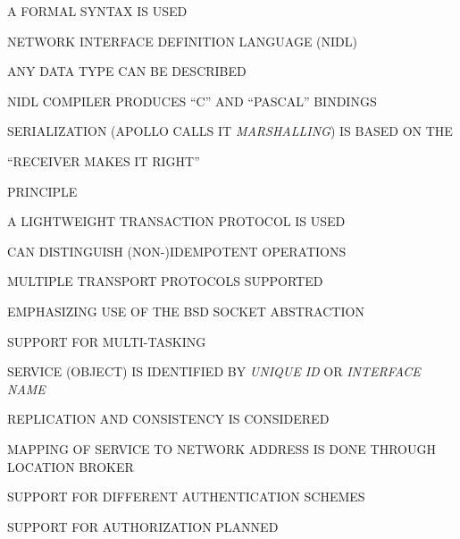 \begin{bwslide}

\begin{nrtc}
\item	A FORMAL SYNTAX IS USED
    \begin{nrtc}
    \item	NETWORK INTERFACE DEFINITION LANGUAGE (NIDL)

    \item	ANY DATA TYPE CAN BE DESCRIBED

    \item	NIDL COMPILER PRODUCES ``C'' AND ``PASCAL'' BINDINGS
    \end{nrtc}

\item	SERIALIZATION (APOLLO CALLS IT \emph{MARSHALLING}) IS BASED ON THE
    \begin{nrtc}
    \item	``RECEIVER MAKES IT RIGHT''
    \end{nrtc}
    PRINCIPLE
\end{nrtc}
\end{bwslide}


\begin{bwslide}

\begin{nrtc}
\item	A LIGHTWEIGHT TRANSACTION PROTOCOL IS USED
    \begin{nrtc}
    \item	CAN DISTINGUISH (NON-)IDEMPOTENT OPERATIONS
    \end{nrtc}

\item	MULTIPLE TRANSPORT PROTOCOLS SUPPORTED
    \begin{nrtc}
    \item	EMPHASIZING USE OF THE BSD SOCKET ABSTRACTION
    \end{nrtc}

\item	SUPPORT FOR MULTI-TASKING
\end{nrtc}
\end{bwslide}


\begin{bwslide}

\begin{nrtc}
\item	SERVICE (OBJECT) IS IDENTIFIED BY \emph{UNIQUE ID} OR
	\emph{INTERFACE NAME} 
    \begin{nrtc}
    \item	REPLICATION AND CONSISTENCY IS CONSIDERED
    \end{nrtc}

\item	MAPPING OF SERVICE TO NETWORK ADDRESS IS DONE THROUGH LOCATION BROKER

\item	SUPPORT FOR DIFFERENT AUTHENTICATION SCHEMES

\item	SUPPORT FOR AUTHORIZATION PLANNED
\end{nrtc}
\end{bwslide}
